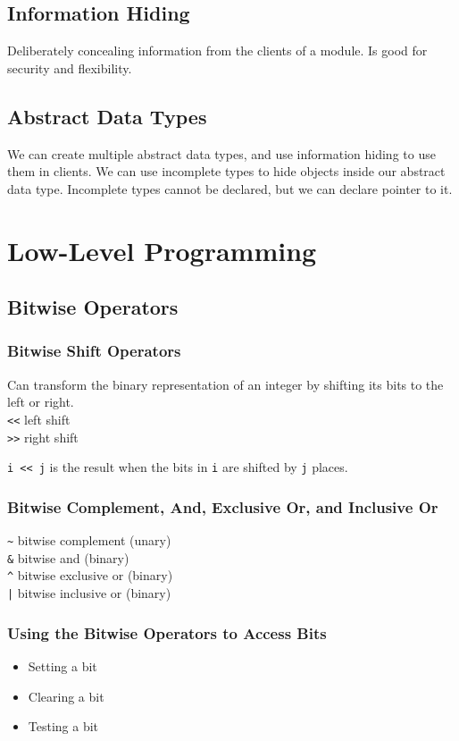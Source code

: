 \documentclass[openany]{book}
\begin{document}
    \section{Information Hiding}
    Deliberately concealing information from the clients of a module. Is good for security and flexibility.

    \section{Abstract Data Types}
    We can create multiple abstract data types, and use information hiding to use them in clients. We can use incomplete types to hide objects inside our abstract data type. Incomplete types cannot be declared, but we can declare pointer to it.



    \chapter{Low-Level Programming}
    
    \section{Bitwise Operators}
    
    \subsection*{Bitwise Shift Operators}
    Can transform the binary representation of an integer by shifting its bits to the left or right. \\
    \texttt{<<} left shift \\
    \texttt{>>} right shift

    \texttt{i << j} is the result when the bits in \texttt{i} are shifted by \texttt{j} places.

    \subsection*{Bitwise Complement, And, Exclusive Or, and Inclusive Or}
    \texttt{\~} bitwise complement (unary) \\
    \texttt{\&} bitwise and (binary) \\
    \texttt{\^} bitwise exclusive or (binary) \\
    \texttt{|} bitwise inclusive or (binary) \\

    \subsection*{Using the Bitwise Operators to Access Bits}
    \begin{itemize}
        \item Setting a bit
        \item Clearing a bit
        \item Testing a bit
    \end{itemize}
\end{document}
